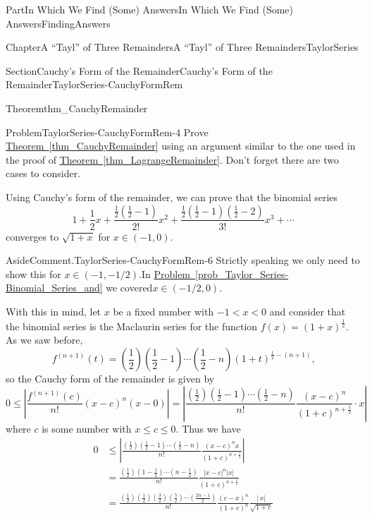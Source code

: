 \documentclass[oneside,10pt,]{book}
\newcommand{\xreffont}{\relax}
\numberwithin{equation}{part}
\newcommand{\abs}[1]{\left|#1\right|}
\newcommand{\lt}{<}
\newcommand{\amp}{&}
\begin{document}
\begin{partptx}{Part}{In Which We Find (Some) Answers}{}{In Which We Find (Some) Answers}{}{}{FindingAnswers}
\begin{chapterptx}{Chapter}{A ``Tayl'' of Three Remainders}{}{A ``Tayl'' of Three Remainders}{}{}{TaylorSeries}
\begin{sectionptx}{Section}{Cauchy's Form of the Remainder}{}{Cauchy's Form of the Remainder}{}{}{TaylorSeries-CauchyFormRem}
\begin{theorem}{Theorem}{}{}{thm_CauchyRemainder}
\end{theorem}
\begin{problem}{Problem}{}{TaylorSeries-CauchyFormRem-4}%
 Prove \hyperref[thm_CauchyRemainder]{Theorem~{\xreffont\ref{thm_CauchyRemainder}}} using an argument similar to the one used in the proof of \hyperref[thm_LagrangeRemainder]{Theorem~{\xreffont\ref{thm_LagrangeRemainder}}}. Don't forget there are two cases to consider.%
\end{problem}
Using Cauchy's form of the remainder, we can prove that the binomial series%
\begin{equation*}
1+\frac{1}{2}x+\frac{\frac{1}{2}\left(\frac{1}{2}-1\right)}{2!}x^2+\frac{\frac{1}{2}\left(\frac{1}{2}-1\right)\left(\frac{1}{2}-2\right)}{3!}x^3+\cdots
\end{equation*}
converges to \(\sqrt{1+x}\) for \(x\in(-1,0).\)%
\begin{aside}{Aside}{Comment.}{TaylorSeries-CauchyFormRem-6}%
Strictly speaking we only need to show this for \(x\in(-1,-1/2).\)In \hyperref[prob_Taylor_Series-Binomial_Series_and]{Problem~{\xreffont\ref{prob_Taylor_Series-Binomial_Series_and}}} we covered\(x\in (-1/2,0)\).%
\end{aside}
With this in mind, let \(x\) be a fixed number with \(-1\lt x\lt 0\) and consider that the binomial series is the Maclaurin series for the function \(f(x)=(1+x)^{\frac{1}{2}}\). As we saw before,%
\begin{equation*}
f^{(n+1)}(t)=\left(\frac{1}{2}\right)\left(\frac{1}{2}-1\right)\cdots\left(\frac{1}{2}-n\right)\left(1+t\right)^{\frac{1}{2}-(n+1)}\text{,}
\end{equation*}
so the Cauchy form of the remainder is given by%
\begin{equation*}
0\le\abs{\frac{f^{(n+1)}(c)}{n!}(x-c)^n(x-0)}= \abs{\frac{\left(\frac{1}{2}\right)\left(\frac{1}{2}-1\right)\cdots\left(\frac{1}{2}-n\right)}{n!}\frac{(x-c)^n}{(1+c)^{n+\frac{1}{2}}}\cdot x}
\end{equation*}
where \(c\) is some number with \(x\leq c\leq 0\). Thus we have%
\begin{align*}
0\amp \leq\left|\frac{\left(\frac{1}{2}\right)\left(\frac{1}{2}-1\right)\cdots\left(\frac{1}{2}-n\right)}{n!}\frac{(x-c)^nx}{(1+c)^{n+\frac{1}{2}}}\right|\\
\amp =\frac{\left(\frac{1}{2}\right)\left(1-\frac{1}{2}\right)\cdots\left(n-\frac{1}{2}\right)}{n!}\frac{|x-c|^n|x|}{(1+c)^{n+\frac{1}{2}}}\\
\amp =\frac{\left(\frac{1}{2}\right)\left(\frac{1}{2}\right)\left(\frac{3}{2}\right)\left(\frac{5}{2}\right)\cdots\left(\frac{2n-1}{2}\right)}{n!}\frac{(c-x)^n}{(1+c)^n}\frac{|\,x|}{\sqrt{1+c}}\\

\end{align*}
\end{sectionptx}
\end{chapterptx}
\end{partptx}
\end{document}
